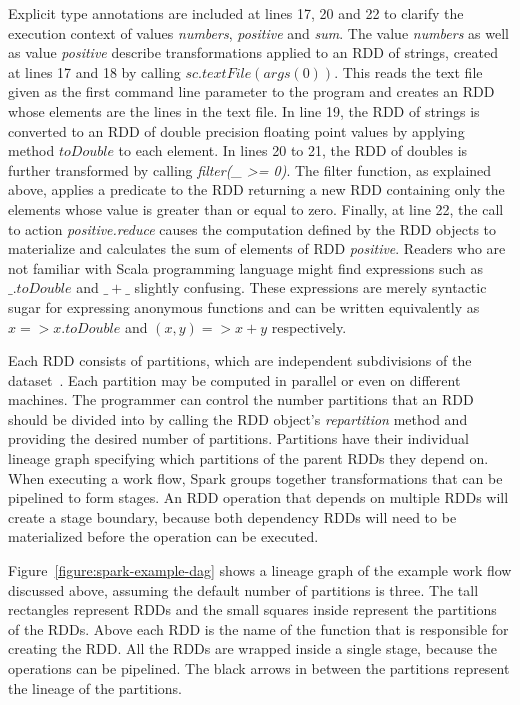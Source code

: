 Explicit type annotations are included at lines 17, 20 and 22 to clarify the execution context of values \textit{numbers}, \textit{positive} and \textit{sum}. The value \textit{numbers} as well as value \textit{positive} describe transformations applied to an RDD of strings, created at lines 17 and 18 by calling $sc.textFile(args(0))$. This reads the text file given as the first command line parameter to the program and creates an RDD whose elements are the lines in the text file. In line 19, the RDD of strings is converted to an RDD of double precision floating point values by applying method $toDouble$ to each element. In lines 20 to 21, the RDD of doubles is further transformed by calling \textit{filter(\_ >= 0)}. The filter function, as explained above, applies a predicate to the RDD returning a new RDD containing only the elements whose value is greater than or equal to zero. Finally, at line 22, the call to action \textit{positive.reduce} causes the computation defined by the RDD objects to materialize and calculates the sum of elements of RDD \textit{positive}. Readers who are not familiar with Scala programming language might find expressions such as $\_.toDouble$ and $\_ + \_$ slightly confusing. These expressions are merely syntactic sugar for expressing anonymous functions and can be written equivalently as $x => x.toDouble$ and $(x, y) => x + y$ respectively.

Each RDD consists of partitions, which are independent subdivisions of the dataset~\cite{Zaharia:2012:RDD:2228298.2228301}. Each partition may be computed in parallel or even on different machines. The programmer can control the number partitions that an RDD should be divided into by calling the RDD object's \textit{repartition} method and providing the desired number of partitions. Partitions have their individual lineage graph specifying which partitions of the parent RDDs they depend on. When executing a work flow, Spark groups together transformations that can be pipelined to form stages. An RDD operation that depends on multiple RDDs will create a stage boundary, because both dependency RDDs will need to be materialized before the operation can be executed.

Figure~\ref{figure:spark-example-dag} shows a lineage graph of the example work flow discussed above, assuming the default number of partitions is three. The tall rectangles represent RDDs and the small squares inside represent the partitions of the RDDs. Above each RDD is the name of the function that is responsible for creating the RDD. All the RDDs are wrapped inside a single stage, because the operations can be pipelined. The black arrows in between the partitions represent the lineage of the partitions.   

